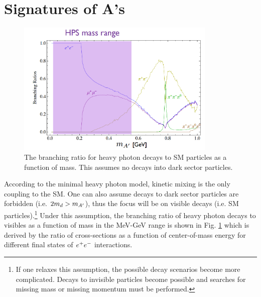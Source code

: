 






\clearpage

\section{Signatures of A's}\label{sec:signatures}

 \begin{figure}
    \centering
    \includegraphics[width=0.85\textwidth]{figs/motivation/br.png}
    \caption{The branching ratio for heavy photon decays to SM particles as a function of mass. This assumes no decays into dark sector particles.}
    \label{fig:br}
\end{figure}

According to the minimal heavy photon model, kinetic mixing is the only coupling to the SM. One can also assume decays to dark sector particles are forbidden (i.e. $2m_d>m_{A^\prime}$), thus the focus will be on visible decays (i.e. SM particles).\footnote{If one relaxes this assumption, the possible decay scenarios become more complicated. Decays to invisible particles become possible and searches for missing mass or missing momentum must be performed.} Under this assumption, the branching ratio of heavy photon decays to visibles as a function of mass in the MeV-GeV range is shown in Fig. \ref{fig:br} which is derived by the ratio of cross-sections as a function of center-of-mass energy for different final states of $e^{+}e^{-}$ interactions.

